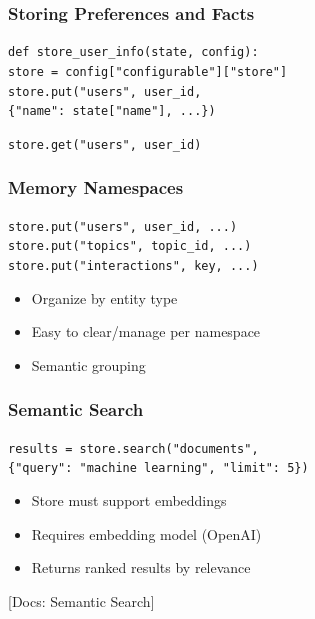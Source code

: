 \documentclass[aspectratio=169,11pt]{beamer}
\newcommand{\docref}[1]{{\scriptsize\color{docgray}[Docs: #1]}}
\begin{document}
\begin{frame}
\frametitle{Storing Preferences and Facts}
\begin{tipbox}[Example]
\texttt{def store\_user\_info(state, config):}\\
\texttt{store = config["configurable"]["store"]}\\
\texttt{store.put("users", user\_id,}\\
\texttt{\{"name": state["name"], ...\})}
\end{tipbox}
\vspace{0.1cm}
\begin{tipbox}
\texttt{store.get("users", user\_id)}
\end{tipbox}
\end{frame}

\begin{frame}
\frametitle{Memory Namespaces}
\begin{tipbox}
\texttt{store.put("users", user\_id, ...)}\\
\texttt{store.put("topics", topic\_id, ...)}\\
\texttt{store.put("interactions", key, ...)}
\end{tipbox}
\vspace{0.1cm}
\begin{tipbox}[Benefits]
\setlength{\itemsep}{1pt}
\begin{itemize}
\item Organize by entity type
\item Easy to clear/manage per namespace
\item Semantic grouping
\end{itemize}
\end{tipbox}
\end{frame}

\begin{frame}
\frametitle{Semantic Search}
\begin{tipbox}
\texttt{results = store.search("documents",}\\
\texttt{\{"query": "machine learning", "limit": 5\})}
\end{tipbox}
\vspace{0.1cm}
\begin{tipbox}[Requirements]
\setlength{\itemsep}{1pt}
\begin{itemize}
\item Store must support embeddings
\item Requires embedding model (OpenAI)
\item Returns ranked results by relevance
\end{itemize}
\end{tipbox}
\docref{Semantic Search}
\end{frame}
\end{document}
